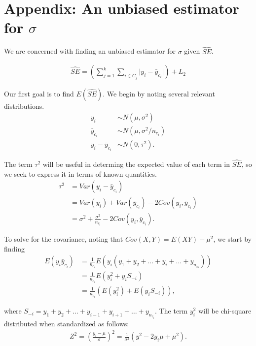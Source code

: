 \section{Appendix: An unbiased estimator for $\sigma$}
\label{Sec:AppSig}

We are concerned with finding an unbiased estimator for $\sigma$ given $\widehat{SE}$.

\begin{align}
\widehat{SE} = \left(\sum_{j=1}^k \sum_{i \in C_j} \lvert y_i - \bar{y}_{c_i} \rvert \right) + L_2 \label{eq:se}
\end{align}

Our first goal is to find $E(\widehat{SE})$. We begin by noting several relevant distributions.
\begin{align*}
y_i &\sim N(\mu, \sigma^2) \\
\bar{y}_{c_i} &\sim N(\mu, \sigma^2/n_{c_i}) \\
y_i - \bar{y}_{c_i} &\sim N(0, \tau^2).
\end{align*}

The term $\tau^2$ will be useful in determing the expected value of each term in $\widehat{SE}$, so we seek to express it in terms of known quantities.
\begin{align}
\tau^2 &= Var(y_i - \bar{y}_{c_i}) \nonumber \\
&= Var(y_i) + Var(\bar{y}_{c_i}) - 2 Cov(y_i, \bar{y}_{c_i}) \nonumber \\
&= \sigma^2 + \frac{\sigma^2}{n_{c_i}} - 2 Cov(y_i, \bar{y}_{c_i}). \label{eq:tau}
\end{align}

To solve for the covariance, noting that $Cov(X,Y) = E(XY) - \mu^2$, we start by finding
\begin{align}
E(y_i \bar{y}_{c_i}) &= \frac{1}{n_{c_i}} E(y_i (y_1 + y_2 + \ldots + y_i + \ldots + y_{n_{c_1}})) \nonumber \\
&= \frac{1}{n_{c_i}} E(y_i^2 + y_i S_{-i}) \nonumber \\
&= \frac{1}{n_{c_i}}\left( E\left(y_i^2\right) + E\left(y_i S_{-i}\right)\right), \label{eq:eyy}
\end{align}

where $S_{-i} = y_1 + y_2 + \ldots + y_{i-1} + y_{i+1} + \ldots + y_{n_{c_i}}$. The term $y_i^2$ will be chi-square distributed when standardized as follows:
\begin{align*}
Z^2 = \left(\frac{y_i - \mu}{\sigma}\right)^2 = \frac{1}{\sigma^2}\left(y^2 - 2y_i\mu + \mu^2\right).
\end{align*}

